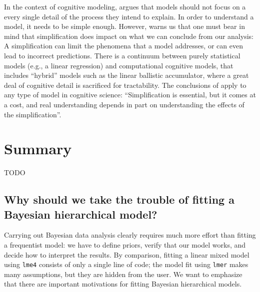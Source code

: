 \documentclass[12pt,]{krantz}
\theoremstyle{definition}
\theoremstyle{definition}
\theoremstyle{definition}
\theoremstyle{remark}
\begin{document}
In the context of cognitive modeling, \citet{mcclellandPlaceModelingCognitive2009} argues that models should not focus on a every single detail of the process they intend to explain. In order to understand a model, it needs to be simple enough. However, \citet{mcclellandPlaceModelingCognitive2009} warns us that one must bear in mind that simplification does impact on what we can conclude from our analysis: A simplification can limit the phenomena that a model addresses, or can even lead to incorrect predictions. There is a continuum between purely statistical models (e.g., a linear regression) and computational cognitive models, that includes ``hybrid'' models such as the linear ballistic accumulator, where a great deal of cognitive detail is sacrificed for tractability. The conclusions of \citet{mcclellandPlaceModelingCognitive2009} apply to any type of model in cognitive science: ``Simplification is essential, but it comes at a cost, and real understanding depends in part on understanding the effects of the simplification''.

\hypertarget{summary-2}{%
\section{Summary}\label{summary-2}}

TODO

\hypertarget{why-should-we-take-the-trouble-of-fitting-a-bayesian-hierarchical-model}{%
\subsection{Why should we take the trouble of fitting a Bayesian hierarchical model?}\label{why-should-we-take-the-trouble-of-fitting-a-bayesian-hierarchical-model}}

Carrying out Bayesian data analysis clearly requires much more effort than fitting a frequentist model: we have to define priors, verify that our model works, and decide how to interpret the results. By comparison, fitting a linear mixed model using \texttt{lme4} consists of only a single line of code; the model fit using \texttt{lmer} makes many assumptions, but they are hidden from the user. We want to emphasize that there are important motivations for fitting Bayesian hierarchical models.
\end{document}
